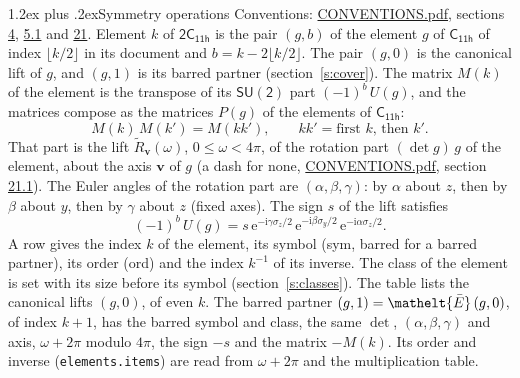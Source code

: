 \documentclass[10pt,a4paper]{article}
\makeatletter
\renewcommand\section{\@startsection{section}{1}{\z@}{-3ex plus -1ex minus -.2ex}%
  {1.2ex plus .2ex}{\normalfont\large\sffamily\bfseries\color{parttitle}}}
\numberwithin{equation}{section}
\newcommand{\eltfont}[1]{{\let\sigma\eltsigma\mathelt{#1}}}
\newcommand{\grp}[1]{\mathsf{#1}}
\newcommand{\elt}[1]{\eltfont{#1}}
\newcommand{\vv}{\mathbf{v}}
\newcommand{\iunit}{\mathrm{i}}
\newcommand{\expe}{\mathrm{e}}
\newcommand{\barred}[1]{\bar{#1}}
\newcommand{\lift}[1]{\tilde{#1}}
\newcommand{\pauli}[1]{\sigma_{#1}}
\makeatother
\begin{document}
\section{Symmetry operations}\label{s:elements}
Conventions: \href{../../CONVENTIONS.pdf}{CONVENTIONS.pdf}, sections \href{../../../rotation/CONVENTIONS.pdf\#conv.4}{4}, \href{../../../rotation/CONVENTIONS.pdf\#conv.5.1}{5.1} and \href{../../CONVENTIONS.pdf\#conv.21}{21}.
\leavevmode\label{n:index.element}\label{n:element.g}Element $k$ of $\grp{2C_{11h}}$ is the pair $(g, b)$ of the element $g$ of \href{../../../rotation/data/pdf/C11h.pdf}{$\grp{C_{11h}}$} of index $\lfloor k/2\rfloor$ in its document and $b = k - 2\lfloor k/2\rfloor$. The pair $(g, 0)$ is the canonical lift of $g$, and $(g, 1)$ is its barred partner (section~\ref{s:cover}). \label{n:matrix.element.pin}\label{n:matrix.element}The matrix $M(k)$ of the element is the transpose of its $\grp{SU(2)}$ part $(-1)^{b}\,U(g)$, and the matrices compose as the matrices $P(g)$ of the elements of $\grp{C_{11h}}$:
\begin{equation}\label{e:mprod}M(k)\,M(k') = M(kk'),\qquad kk' = \text{first } k\text{, then } k'.\end{equation}
\leavevmode\label{n:angle.omega}\label{n:vector.axis}\label{n:vector.pole}That part is the lift $\lift{R}_{\vv}(\omega)$, $0 \le \omega < 4\pi$, of the rotation part $(\det g)\,g$ of the element, about the axis $\vv$ of $g$ (a dash for none, \href{../../CONVENTIONS.pdf}{CONVENTIONS.pdf}, section \href{../../CONVENTIONS.pdf\#conv.21.1}{21.1}). \label{n:angle.euler.alpha}\label{n:angle.euler.beta}\label{n:angle.euler.gamma}\label{n:vector.coordinates}The Euler angles of the rotation part are $(\alpha,\beta,\gamma)$: by $\alpha$ about $z$, then by $\beta$ about $y$, then by $\gamma$ about $z$ (fixed axes). \label{n:local.euler.sign}The sign $s$ of the lift satisfies
\begin{equation}\label{e:euler}(-1)^{b}\,U(g) = s\,\expe^{-\iunit\gamma\pauli{z}/2}\,\expe^{-\iunit\beta\pauli{y}/2}\,\expe^{-\iunit\alpha\pauli{z}/2}.\end{equation}
\leavevmode\label{n:index.element.inverse}\label{n:head.sym}\label{n:head.ord}A row gives the index $k$ of the element, its symbol (sym, barred for a barred partner), its order (ord) and the index $k^{-1}$ of its inverse. \label{n:head.class}The class of the element is set with its size before its symbol (section~\ref{s:classes}).
The table lists the canonical lifts $(g, 0)$, of even $k$. The barred partner $(g, 1) = \elt{\barred{E}}\,(g, 0)$, of index $k + 1$, has the barred symbol and class, the same $\det$, $(\alpha,\beta,\gamma)$ and axis, $\omega + 2\pi$ modulo $4\pi$, the sign $-s$ and the matrix $-M(k)$. Its order and inverse (\texttt{elements.items}) are read from $\omega + 2\pi$ and the multiplication table.
\end{document}
